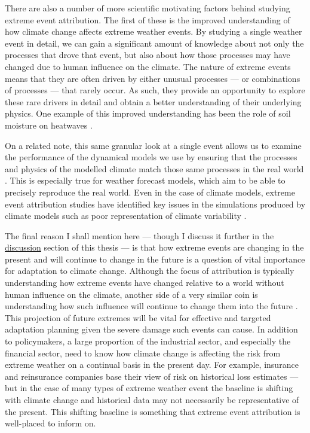   There are also a number of more scientific motivating factors behind studying extreme event attribution. The first of these is the improved understanding of how climate change affects extreme weather events. By studying a single weather event in detail, we can gain a significant amount of knowledge about not only the processes that drove that event, but also about how those processes may have changed due to human influence on the climate. The nature of extreme events means that they are often driven by either unusual processes --- or combinations of processes --- that rarely occur. As such, they provide an opportunity to explore these rare drivers in detail and obtain a better understanding of their underlying physics. One example of this improved understanding has been the role of soil moisture on heatwaves \citep{fischer_soil_2007,fischer_contribution_2007,wehrli_identifying_2019}. %

  On a related note, this same granular look at a single event allows us to examine the performance of the dynamical models we use by ensuring that the processes and physics of the modelled climate match those same processes in the real world \citep{sillmann_understanding_2017,philip_protocol_2020}. This is especially true for weather forecast models, which aim to be able to precisely reproduce the real world. Even in the case of climate models, extreme event attribution studies have identified key issues in the simulations produced by climate models such as poor representation of climate variability \citep{bellprat_towards_2019,leach_anthropogenic_2020}.

  The final reason I shall mention here --- though I discuss it further in the \hyperref[discussion]{discussion} section of this thesis --- is that how extreme events are changing in the present and will continue to change in the future is a question of vital importance for adaptation to climate change. Although the focus of attribution is typically understanding how extreme events have changed relative to a world without human influence on the climate, another side of a very similar coin is understanding how such influence will continue to change them into the future \citep{harrington_integrating_2022}. This projection of future extremes will be vital for effective and targeted adaptation planning given the severe damage such events can cause. In addition to policymakers, a large proportion of the industrial sector, and especially the financial sector, need to know how climate change is affecting the risk from extreme weather on a continual basis in the present day. For example, insurance and reinsurance companies base their view of risk on historical loss estimates --- but in the case of many types of extreme weather event the baseline is shifting with climate change and historical data may not necessarily be representative of the present. This shifting baseline is something that extreme event attribution is well-placed to inform on.

